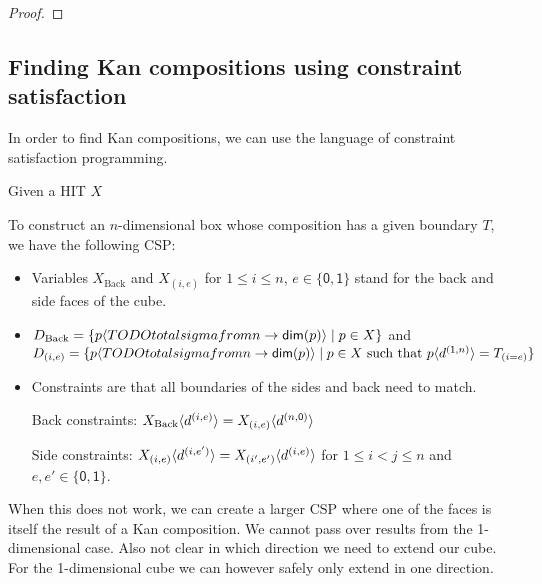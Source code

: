 \documentclass{llncs}
\newcommand{\todo}[1]{
  \begin{tcolorbox}
    TODO {#1} 
  \end{tcolorbox}
}
\newcommand{\izero}{\mathsf{0}}
\newcommand{\ione}{\mathsf{1}}
\renewcommand{\dim}[1]{\mathsf{dim}({#1})}
\newcommand{\dmap}[2]{d^{({#1} , {#2})}}
\newcommand{\cont}[2]{\ensuremath{ \ifthenelse{\equal{#2}{}}{#1}{{#1}\langle{#2}\rangle}} }
\newcommand{\termface}[3]{\cont{#1}{\dmap{#2}{#3}}}
\newcommand{\boundaryface}[3]{{#1}_{({#2}={#3})}}
\newcommand{\cset}[1]{\ensuremath{\mathsf{{#1}}}}
\begin{document}
\begin{proposition}
\begin{proof}


\end{proof}
\end{proposition}


\subsection{Finding Kan compositions using constraint satisfaction}

In order to find Kan compositions, we can use the language of constraint
satisfaction programming.

Given a HIT $X$

To construct an $n$-dimensional box whose composition has a given boundary $T$, we
have the following CSP:

\begin{itemize}
\item Variables $X_{\text{Back}}$ and $X_{(i,e)}$ for $1 \leq i \leq n$,
  $e\in\{\izero,\ione\}$ stand for the back and side faces of the cube.
\item $D_{\text{Back}} = \{ \cont{p}{TODO total sigma from n \to \dim{p}} \mid p \in X \}$
  and
  $D_{(i,e)} = \{ \cont{p}{TODO total sigma from n \to \dim{p}} \mid p \in X
  \text{ such that } \cont{p}{\dmap{\ione}{n}} = \boundaryface{T}{i}{e} \}$
\item Constraints are that all boundaries of the sides and back need to match.

  Back constraints: $\termface{X_{\text{Back}}}{i}{e} =
  \termface{X_{(i,e)}}{n}{\izero}$

  Side constraints: $\termface{X_{(i,e)}}{i}{e'} = \termface{X_{(i',e')}}{i}{e}$
  for $1 \leq i < j \leq n$ and $e,e' \in \{ \izero, \ione \}$.
\end{itemize}


When this does not work, we can create a larger CSP where one of the faces is
itself the result of a Kan composition. We cannot pass over results from the
1-dimensional case. Also not clear in which direction we need to extend our
cube. For the 1-dimensional cube we can however safely only extend in one direction.
\end{document}
